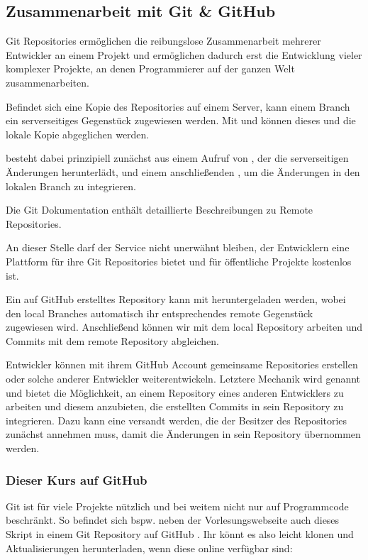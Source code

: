 \documentclass[parskip=half, final]{scrreprt}
\begin{document}
\subsection{Zusammenarbeit mit Git \& GitHub}

Git Repositories ermöglichen die reibungslose Zusammenarbeit mehrerer Entwickler an einem Projekt und ermöglichen dadurch erst die Entwicklung vieler komplexer Projekte, an denen Programmierer auf der ganzen Welt zusammenarbeiten.

Befindet sich eine Kopie des Repositories auf einem Server, kann einem Branch ein serverseitiges Gegenstück zugewiesen werden. Mit  und  können dieses  und die lokale Kopie abgeglichen werden.

 besteht dabei prinzipiell zunächst aus einem Aufruf von , der die serverseitigen Änderungen herunterlädt, und einem anschließenden , um die Änderungen in den lokalen Branch zu integrieren.

Die Git Dokumentation  enthält detaillierte Beschreibungen zu Remote Repositories.

An dieser Stelle darf der Service  nicht unerwähnt bleiben, der Entwicklern eine Plattform für ihre Git Repositories bietet und für öffentliche Projekte kostenlos ist.

Ein auf GitHub erstelltes Repository kann mit  heruntergeladen werden, wobei den local Branches automatisch ihr entsprechendes remote Gegenstück zugewiesen wird. Anschließend können wir mit dem local Repository arbeiten und Commits mit dem remote Repository abgleichen.

Entwickler können mit ihrem GitHub Account gemeinsame Repositories erstellen oder solche anderer Entwickler weiterentwickeln. Letztere Mechanik wird  genannt und bietet die Möglichkeit, an einem Repository eines anderen Entwicklers zu arbeiten und diesem anzubieten, die erstellten Commits in sein Repository zu integrieren. Dazu kann eine  versandt werden, die der Besitzer des Repositories zunächst annehmen muss, damit die Änderungen in sein Repository übernommen werden.

\subsubsection{Dieser Kurs auf GitHub}

Git ist für viele Projekte nützlich und bei weitem nicht nur auf Programmcode beschränkt. So befindet sich bspw. neben der Vorlesungswebseite auch dieses Skript in einem Git Repository auf GitHub . Ihr könnt es also leicht klonen und Aktualisierungen herunterladen, wenn diese online verfügbar sind:
\end{document}
